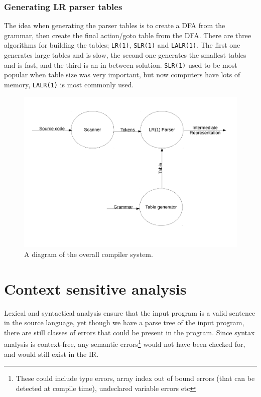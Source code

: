 \subsubsection{Generating LR parser tables}

The idea when generating the parser tables is to create a DFA from the grammar,
then create the final action/goto table from the DFA. There are three algorithms
for building the tables; \texttt{LR(1)}, \texttt{SLR(1)} and \texttt{LALR(1)}.
The first one generates large tables and is slow, the second one generates the
smallest tables and is fast, and the third is an in-between solution.
\texttt{SLR(1)} used to be most popular when table size was very important, but
now computers have lots of memory, \texttt{LALR(1)} is most commonly used.


\begin{figure}
  \includegraphics[width=\textwidth]{diagrams/big-picture-1}
  \caption{A diagram of the overall compiler system.}
\end{figure}




\section{Context sensitive analysis}

Lexical and syntactical analysis ensure that the input program is a
valid sentence in the source language, yet though we have a parse tree
of the input program, there are still classes of errors that could be
present in the program. Since syntax analysis is context-free, any
semantic errors\footnote{These could include type errors, array index
out of bound errors (that can be detected at compile time), undeclared
variable errors etc} would not have been checked for, and would still
exist in the IR.

